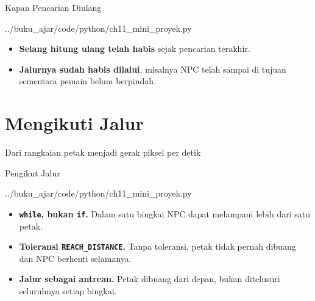 \documentclass[aspectratio=169,10pt]{beamer}
\begin{document}
\begin{frame}[fragile]{Kapan Pencarian Diulang}

  {../buku_ajar/code/python/ch11_mini_proyek.py}
\vspace{0.10cm}
\begin{itemize}
  \item \textbf{Selang hitung ulang telah habis} sejak pencarian terakhir.
  \item \textbf{Jalurnya sudah habis dilalui}, misalnya NPC telah sampai di
        tujuan sementara pemain belum berpindah.
\end{itemize}
\end{frame}

\section{Mengikuti Jalur}
  {Dari rangkaian petak menjadi gerak piksel per detik}

\begin{frame}[fragile]{Pengikut Jalur}

  {../buku_ajar/code/python/ch11_mini_proyek.py}
\vspace{0.10cm}
{\scriptsize
\begin{itemize}
  \item \textbf{\texttt{while}, bukan \texttt{if}.} Dalam satu bingkai NPC dapat
        melampaui lebih dari satu petak.
  \item \textbf{Toleransi \texttt{REACH\_DISTANCE}.} Tanpa toleransi, petak tidak
        pernah dibuang dan NPC berhenti selamanya.
  \item \textbf{Jalur sebagai antrean.} Petak dibuang dari depan, bukan ditelusuri
        seluruhnya setiap bingkai.
\end{itemize}}
\end{frame}
\end{document}
